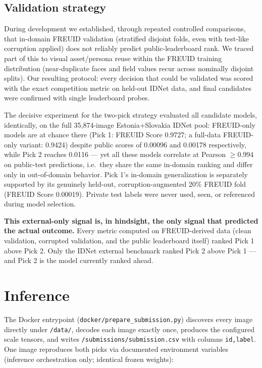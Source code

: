 \documentclass[11pt,a4paper]{article}
\begin{document}
\subsection{Validation strategy}
\label{sec:validation}
During development we established, through repeated controlled comparisons, that
in-domain FREUID validation (stratified disjoint folds, even with test-like
corruption applied) does not reliably predict public-leaderboard rank. We traced
part of this to visual asset/persona reuse within the FREUID training
distribution (near-duplicate faces and field values recur across nominally
disjoint splits). Our resulting protocol: every decision that could be validated
was scored with the exact competition metric on held-out IDNet data, and final
candidates were confirmed with single leaderboard probes.

The decisive experiment for the two-pick strategy evaluated all candidate
models, identically, on the full 35{,}874-image Estonia+Slovakia IDNet pool:
FREUID-only models are at chance there (Pick 1: FREUID Score 0.9727; a
full-data FREUID-only variant: 0.9424) despite public scores of 0.00096 and
0.00178 respectively, while Pick 2 reaches 0.0116 --- yet all these models
correlate at Pearson $\ge$0.994 on public-test predictions, i.e.\ they share
the same in-domain ranking and differ only in out-of-domain behavior. Pick 1's
in-domain generalization is separately supported by its genuinely held-out,
corruption-augmented 20\% FREUID fold (FREUID Score 0.00019). Private test
labels were never used, seen, or referenced during model selection.

\textbf{This external-only signal is, in hindsight, the only signal that
predicted the actual outcome.} Every metric computed on FREUID-derived data
(clean validation, corrupted validation, and the public leaderboard itself)
ranked Pick 1 above Pick 2. Only the IDNet external benchmark ranked Pick 2
above Pick 1 --- and Pick 2 is the model currently ranked ahead.

\section{Inference}
\label{sec:inference}
The Docker entrypoint (\texttt{docker/prepare\_submission.py}) discovers every
image directly under \texttt{/data/}, decodes each image exactly once, produces
the configured scale tensors, and writes \texttt{/submissions/submission.csv}
with columns \texttt{id,label}. One image reproduces both picks via documented
environment variables (inference orchestration only; identical frozen weights):
\end{document}
